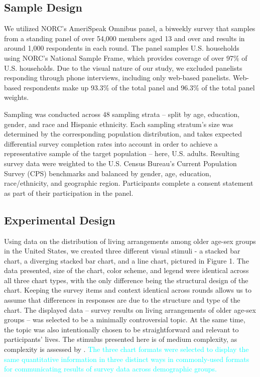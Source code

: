 \documentclass{IEEEcsmag}
\begin{document}
\subsection{Sample Design}\label{sample-design}

We utilized NORC's AmeriSpeak Omnibus panel, a biweekly survey that samples from a standing panel of over 54,000 members aged 13 and over  and results in around 1,000 respondents in each round. The panel samples U.S. households using NORC's National Sample Frame, which provides coverage of over 97\% of U.S. households. Due to the visual nature of our study, we excluded panelists responding through phone interviews, including only web-based panelists. Web-based respondents make up 93.3\% of the total panel and 96.3\% of the total panel weights.

Sampling was conducted across 48 sampling strata -- split by age, education, gender, and race and Hispanic ethnicity. Each sampling stratum's size was determined by the corresponding population distribution, and takes expected differential survey completion rates into account in order to achieve a representative sample of the target population -- here, U.S. adults. Resulting survey data were weighted to the U.S. Census Bureau's Current Population Survey (CPS) benchmarks and balanced by gender, age, education, race/ethnicity, and geographic region. Participants complete a consent statement as part of their participation in the panel.

\subsection{Experimental Design}\label{experimental-design}

Using data on the distribution of living arrangements among older age-sex groups in the United States, we created three different visual stimuli - a stacked bar chart, a diverging stacked bar chart, and a line chart, pictured in Figure 1. The data presented, size of the chart, color scheme, and legend were identical across all three chart types, with the only difference being the structural design of the chart. Keeping the survey items and context identical across rounds allows us to assume that differences in responses are due to the structure and type of the chart. The displayed data -- survey results on living arrangements of older age-sex groups -- was selected to be a minimally controversial topic. At the same time, the topic was also intentionally chosen to be straightforward and relevant to participants' lives. The stimulus presented here is of medium complexity, as complexity is assessed by . \textcolor{cyan}{The three chart formats were selected to display the same quantitative information in three distinct ways in commonly-used formats for communicating results of survey data across demographic groups.}
\end{document}
